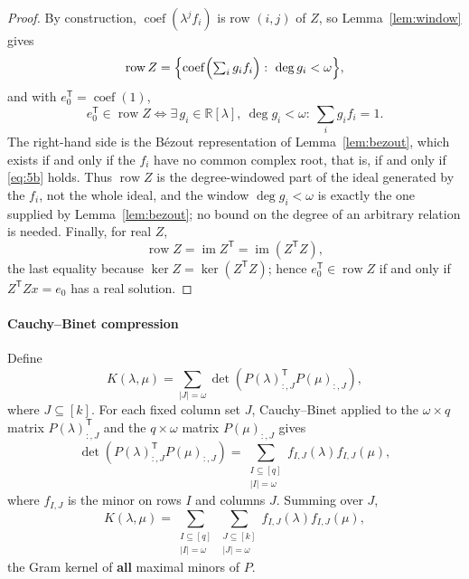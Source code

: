 \documentclass[journal]{IEEEtran}
\theoremstyle{plainn}
\theoremstyle{remark}
\begin{document}
\begin{proof}
	By construction, $\operatorname{coef}(\lambda^jf_i)$ is row $(i,j)$ of
	$Z$, so Lemma~\ref{lem:window} gives
	\[
	\operatorname{row}Z=
	\Bigl\{
	\operatorname{coef}\Bigl(\textstyle\sum_i g_if_i\Bigr)
	:\ \deg g_i<\omega
	\Bigr\},
	\]
	and with $e_0^{\mathsf T}=\operatorname{coef}(1)$,
	\[
	e_0^{\mathsf T}\in\operatorname{row}Z
	\iff
	\exists\,g_i\in\mathbb R[\lambda],\ \deg g_i<\omega:\
	\sum_i g_if_i=1 .
	\]
	The right-hand side is the B\'ezout representation of
	Lemma~\ref{lem:bezout}, which exists if and only if the $f_i$ have no
	common complex root, that is, if and only if \eqref{eq:5b} holds. Thus
	$\operatorname{row}Z$ is the degree-windowed part of the ideal generated
	by the $f_i$, not the whole ideal, and the window $\deg g_i<\omega$ is
	exactly the one supplied by Lemma~\ref{lem:bezout}; no bound on the
	degree of an arbitrary relation is needed. Finally, for real $Z$,
	\[
	\operatorname{row}Z=\operatorname{im}Z^{\mathsf T}
	=\operatorname{im}(Z^{\mathsf T}Z),
	\]
	the last equality because $\ker Z=\ker(Z^{\mathsf T}Z)$; hence
	$e_0^{\mathsf T}\in\operatorname{row}Z$ if and only if
	$Z^{\mathsf T}Zx=e_0$ has a real solution.
\end{proof}

\paragraph*{Cauchy--Binet compression}\label{sec:cb}
Define
\[
K(\lambda,\mu)=\sum_{|J|=\omega}
\det\left(P(\lambda)_{:,J}^{\mathsf T}P(\mu)_{:,J}\right),
\]
where $J\subseteq[k]$. For each fixed column set $J$, Cauchy--Binet applied
to the $\omega\times q$ matrix $P(\lambda)_{:,J}^{\mathsf T}$ and the
$q\times\omega$ matrix $P(\mu)_{:,J}$ gives
\[
\det\!\left(P(\lambda)_{:,J}^{\mathsf T}P(\mu)_{:,J}\right)
=\sum_{\substack{I\subseteq[q]\\ |I|=\omega}}
f_{I,J}(\lambda)f_{I,J}(\mu),
\]
where $f_{I,J}$ is the minor on rows $I$ and columns $J$. Summing over $J$,
\[
K(\lambda,\mu)=\sum_{\substack{I\subseteq[q]\\ |I|=\omega}}
\sum_{\substack{J\subseteq[k]\\ |J|=\omega}}
f_{I,J}(\lambda)f_{I,J}(\mu),
\]
the Gram kernel of \textbf{all} maximal minors of $P$.
\end{document}

